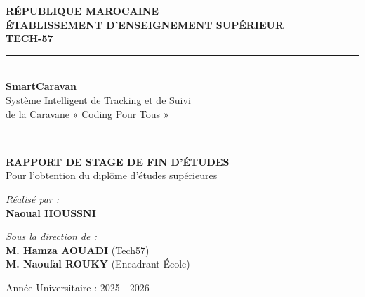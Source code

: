 \documentclass[12pt,a4paper]{report}
\begin{document}
\begin{titlepage}
    \centering
    \vspace*{1cm}
    
    {\Large \textbf{RÉPUBLIQUE MAROCAINE}} \\[0.2cm]
    {\large \textbf{ÉTABLISSEMENT D'ENSEIGNEMENT SUPÉRIEUR}} \\[1.5cm]
    
    {\Large \textbf{TECH-57}} \\[0.5cm]
    
    \rule{\linewidth}{0.5mm} \\[0.5cm]
    {\Huge \textbf{\color{techblue} SmartCaravan}} \\[0.5cm]
    {\Large Système Intelligent de Tracking et de Suivi\\ de la Caravane « Coding Pour Tous »} \\[0.4cm]
    \rule{\linewidth}{0.5mm} \\[1.5cm]
    
    {\large \textbf{RAPPORT DE STAGE DE FIN D'ÉTUDES}} \\[0.2cm]
    {\large Pour l'obtention du diplôme d'études supérieures} \\[1.5cm]
    
    \begin{minipage}{0.45\textwidth}
        \begin{flushleft} \large
            \emph{Réalisé par :}\\
            \textbf{Naoual HOUSSNI}
        \end{flushleft}
    \end{minipage}
    \hfill
    \begin{minipage}{0.45\textwidth}
        \begin{flushright} \large
            \emph{Sous la direction de :}\\
            \textbf{M. Hamza AOUADI} (Tech57)\\
            \textbf{M. Naoufal ROUKY} (Encadrant École)
        \end{flushright}
    \end{minipage}
    
    \vfill
    {\large Année Universitaire : 2025 - 2026}
\end{titlepage}
\end{document}
